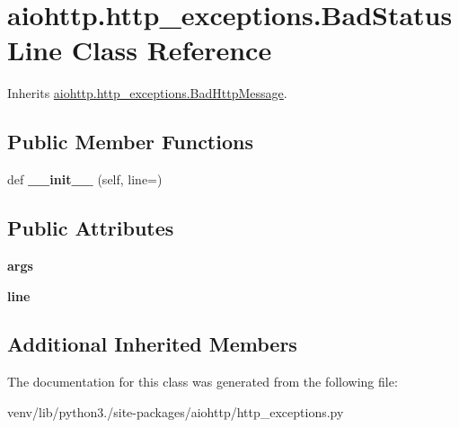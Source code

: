 \hypertarget{classaiohttp_1_1http__exceptions_1_1_bad_status_line}{}\section{aiohttp.\+http\+\_\+exceptions.\+Bad\+Status\+Line Class Reference}
\label{classaiohttp_1_1http__exceptions_1_1_bad_status_line}


Inherits \hyperlink{classaiohttp_1_1http__exceptions_1_1_bad_http_message}{aiohttp.\+http\+\_\+exceptions.\+Bad\+Http\+Message}.

\subsection*{Public Member Functions}
\begin{DoxyCompactItemize}
\item 
\mbox{\label{classaiohttp_1_1http__exceptions_1_1_bad_status_line_a2dfef55e5ddfec3fe928b48e16878a4e}} 
def {\bfseries \+\_\+\+\_\+init\+\_\+\+\_\+} (self, line=\textquotesingle{}\textquotesingle{})
\end{DoxyCompactItemize}
\subsection*{Public Attributes}
\begin{DoxyCompactItemize}
\item 
\mbox{\label{classaiohttp_1_1http__exceptions_1_1_bad_status_line_a94388dfab7ef2787afb739c49d8bed03}} 
{\bfseries args}
\item 
\mbox{\label{classaiohttp_1_1http__exceptions_1_1_bad_status_line_a1332d984218600e44d458790ed7702e0}} 
{\bfseries line}
\end{DoxyCompactItemize}
\subsection*{Additional Inherited Members}


The documentation for this class was generated from the following file\+:\begin{DoxyCompactItemize}
\item 
venv/lib/python3./site-\/packages/aiohttp/http\+\_\+exceptions.\+py\end{DoxyCompactItemize}
